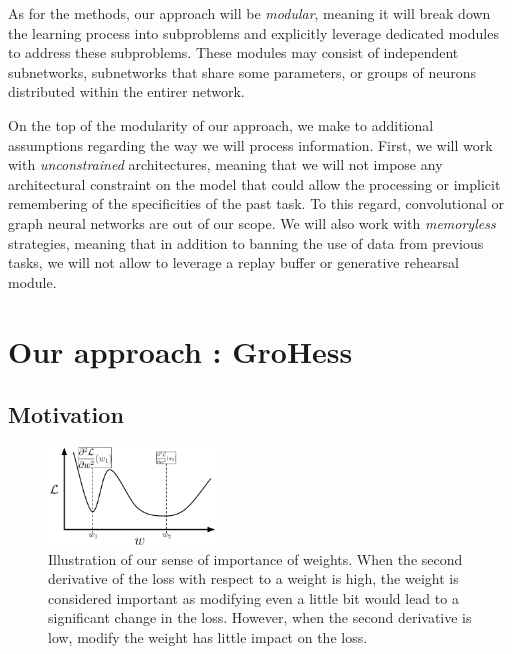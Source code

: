 \documentclass[11pt]{article}
\begin{document}
\vspace{2mm}
\noindent
As for the methods, our approach will be \textit{modular}, meaning it will break down the learning process into subproblems and explicitly leverage dedicated modules to address these subproblems. These modules may consist of independent subnetworks, subnetworks that share some parameters, or groups of neurons distributed within the entirer network.

\vspace{2mm}
\noindent
On the top of the modularity of our approach, we make to additional assumptions regarding the way we will process information. First, we will work with \textit{unconstrained} architectures, meaning that we will not impose any architectural constraint on the model that could allow the processing or implicit remembering of the specificities of the past task. To this regard, convolutional or graph neural networks are out of our scope. We will also work with \textit{memoryless} strategies, meaning that in addition to banning the use of data from previous tasks, we will not allow to leverage a replay buffer or generative rehearsal module.




\section{Our approach : GroHess}



\subsection{Motivation}


\begin{figure}
    \centering
    \includegraphics[width=0.40\textwidth]{images/motivation_GroHess.png}
    \caption{Illustration of our sense of importance of weights. When the second derivative of the loss with respect to a weight is high, the weight is considered important as modifying even a little bit would lead to a significant change in the loss. However, when the second derivative is low, modify the weight has little impact on the loss.}
    \label{fig:motivation_GroHess}
\end{figure}
\end{document}
